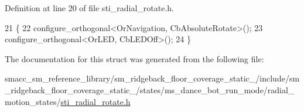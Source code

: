 Definition at line 20 of file sti\+\_\+radial\+\_\+rotate.\+h.


\begin{DoxyCode}
21       \{
22         configure\_orthogonal<OrNavigation, CbAbsoluteRotate>();
23         configure\_orthogonal<OrLED, CbLEDOff>();
24       \}
\end{DoxyCode}


The documentation for this struct was generated from the following file\+:\begin{DoxyCompactItemize}
\item 
smacc\+\_\+sm\+\_\+reference\+\_\+library/sm\+\_\+ridgeback\+\_\+floor\+\_\+coverage\+\_\+static\+\_/include/sm\+\_\+ridgeback\+\_\+floor\+\_\+coverage\+\_\+static\+\_/states/ms\+\_\+dance\+\_\+bot\+\_\+run\+\_\+mode/radial\+\_\+motion\+\_\+states/\hyperlink{sm__ridgeback__floor__coverage__static__1_2include_2sm__ridgeback__floor__coverage__static__1_2s8cf475053b2cc6693b13ab5f8b462b0d}{sti\+\_\+radial\+\_\+rotate.\+h}\end{DoxyCompactItemize}
